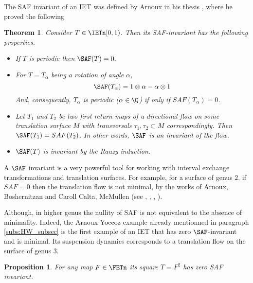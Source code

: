 \documentclass[12pt]{article}
\newtheorem{theorem}{Theorem}
\newtheorem{proposition}{Proposition}
\theoremstyle{definition}
\begin{document}
The SAF invariant of an IET was defined by Arnoux in his thesis \cite{A81}, where he proved the following

\begin{theorem}\cite{A81}
Consider $T \in \IETn [0,1)$. Then its SAF-invariant has the following properties.
\begin{itemize}
\item[1.] If $T$ is periodic then $\SAF(T)=0$.
\item[2.] For $T=T_{\alpha}$ being a rotation of angle $\alpha$,
\begin{equation*} 
 \SAF(T_{\alpha})=1 \otimes \alpha - \alpha \otimes 1
 \end{equation*}
 And, consequently, $T_{\alpha}$ is periodic ($\alpha \in \Q$) if only if $SAF(T_{\alpha})=0$.
\item[3.] Let $T_1$ and $T_2$ be two first return maps of a directional flow on some translation surface $M$ with transversals $\tau_1, \tau_2 \subset M$ correspondingly. Then $\SAF(T_1)=SAF(T_2)$. In other words, $\SAF$ is an invariant of the flow. 
\item[4.] $\SAF(T)$ is invariant by the Rauzy induction.
\end{itemize}
\end{theorem}

A $\SAF$ invariant is a very powerful tool for working with interval exchange transformations and translation surfaces. For example, for a surface of genus $2$, if $SAF=0$ then the translation flow is not minimal, by the works of Arnoux, Boshernitzan and Caroll Calta, McMullen (see \cite{A88}, \cite{BC}, \cite{Ca},  \cite{M12}).

Although, in higher genus the nullity of SAF is not equivalent to the absence of minimality. Indeed, the Arnoux-Yoccoz example \cite{A88} already mentionned in paragraph \ref{subs:HW_subsec} is the first example of an IET that has zero $\SAF$-invariant and is minimal. Its suspension dynamics corresponds to a translation flow on the surface of genus $3$. 

\begin{proposition}
For any map $F \in \FETn$ its square $T=F^2$ has zero SAF invariant.
\end{proposition}
\end{document}
